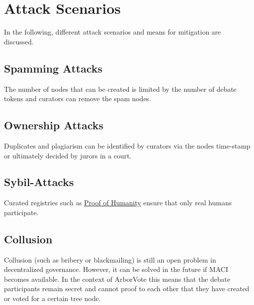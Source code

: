 \documentclass[%
aip,
amsmath,amssymb,
reprint,%
unsortedaddress,
nofootinbib
]{revtex4-2}
\begin{document}




\section{Attack Scenarios}
In the following, different attack scenarios and means for mitigation are discussed.

\subsection{Spamming Attacks}
The number of nodes that can be created is limited by the number of debate tokens and
curators can remove the spam nodes.

\subsection{Ownership Attacks}
Duplicates and plagiarism can be identified by  curators via the nodes time-stamp
or ultimately decided by jurors in a court.

\subsection{Sybil-Attacks}
Curated registries such as \href{https://proofofhumanity.id/}{Proof of Humanity}
ensure that only real humans participate.


\subsection{Collusion}
Collusion (such as bribery or blackmailing) is still an open problem in decentralized governance.
However, it can be solved in the future if \ac{MACI}\cite{Buterin2021} becomes available.
In the context of ArborVote this means that the debate participants remain secret and cannot proof to each other that they have created or voted for a certain tree node.
\end{document}
